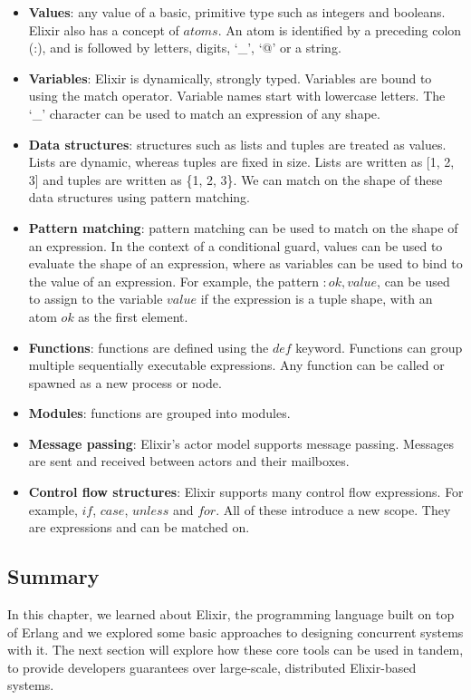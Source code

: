 \begin{itemize}
    \item \textbf{Values}: any value of a basic, primitive type such as integers and booleans. Elixir also has a concept of $atoms$. An atom is identified by a preceding colon (:), and is followed by letters, digits, `\_', `@' or a string.
    \item \textbf{Variables}: Elixir is dynamically, strongly typed. Variables are bound to using the match operator. Variable names start with lowercase letters. The `\_' character can be used to match an expression of any shape.
    \item \textbf{Data structures}: structures such as lists and tuples are treated as values. Lists are dynamic, whereas tuples are fixed in size. Lists are written as [1, 2, 3] and tuples are written as \{1, 2, 3\}. We can match on the shape of these data structures using pattern matching.
    \item \textbf{Pattern matching}: pattern matching can be used to match on the shape of an expression. In the context of a conditional guard, values can be used to evaluate the shape of an expression, where as variables can be used to bind to the value of an expression. For example, the pattern ${:ok, value}$, can be used to assign to the variable $value$ if the expression is a tuple shape, with an atom $ok$ as the first element.
    \item \textbf{Functions}: functions are defined using the $def$ keyword. Functions can group multiple sequentially executable expressions. Any function can be called or spawned as a new process or node.
    \item \textbf{Modules}: functions are grouped into modules.
    \item \textbf{Message passing}: Elixir's actor model supports message passing. Messages are sent and received between actors and their mailboxes.
    \item \textbf{Control flow structures}: Elixir supports many control flow expressions. For example, $if$, $case$, $unless$ and $for$. All of these introduce a new scope. They are expressions and can be matched on.
\end{itemize}
\subsection{Summary}
In this chapter, we learned about Elixir, the programming language built on top of Erlang and we explored some basic approaches to designing concurrent systems with it. The next section will explore how these core tools can be used in tandem, to provide developers guarantees over large-scale, distributed Elixir-based systems.